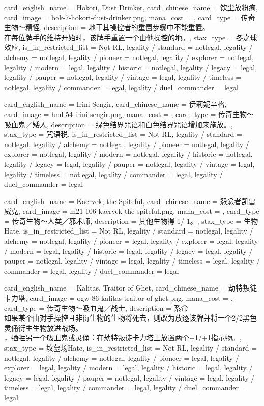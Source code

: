 \documentclass[lang = cn, color = black, 10pt]{AllThatStax}
\begin{document}
\card
{
	card_english_name = {Hokori, Dust Drinker},
	card_chinese_name = {饮尘放粉痢},
	card_image = bok-7-hokori-dust-drinker.png,
	mana_cost = ,
	card_type = 传奇生物～精怪,
	description = {地于其操控者的重置步骤中不能重置。\\
在每位牌手的维持开始时，该牌手重置一个由他操控的地。},
	stax_type = 冬之球效应,
	is_in_restricted_list = Not RL,
	legality / standard = notlegal,
	legality / alchemy = notlegal,
	legality / pioneer = notlegal,
	legality / explorer = notlegal,
	legality / modern = legal,
	legality / historic = notlegal,
	legality / legacy = legal,
	legality / pauper = notlegal,
	legality / vintage = legal,
	legality / timeless = notlegal,
	legality / commander = legal,
	legality / duel_commander = legal
}

\card
{
	card_english_name = {Irini Sengir},
	card_chinese_name = {伊莉妮辛格},
	card_image = hml-54-irini-sengir.png,
	mana_cost = ,
	card_type = 传奇生物～吸血鬼／矮人,
	description = {绿色结界咒语和白色结界咒语增加来施放。},
	stax_type = 咒语税,
	is_in_restricted_list = Not RL,
	legality / standard = notlegal,
	legality / alchemy = notlegal,
	legality / pioneer = notlegal,
	legality / explorer = notlegal,
	legality / modern = notlegal,
	legality / historic = notlegal,
	legality / legacy = legal,
	legality / pauper = notlegal,
	legality / vintage = legal,
	legality / timeless = notlegal,
	legality / commander = legal,
	legality / duel_commander = legal
}

\card
{
	card_english_name = {Kaervek, the Spiteful},
	card_chinese_name = {怨忿者凯雷威克},
	card_image = m21-106-kaervek-the-spiteful.png,
	mana_cost = ,
	card_type = 传奇生物～人类／邪术师,
	description = {其他生物得-1/-1。},
	stax_type = 生物Hate,
	is_in_restricted_list = Not RL,
	legality / standard = notlegal,
	legality / alchemy = notlegal,
	legality / pioneer = legal,
	legality / explorer = legal,
	legality / modern = legal,
	legality / historic = legal,
	legality / legacy = legal,
	legality / pauper = notlegal,
	legality / vintage = legal,
	legality / timeless = legal,
	legality / commander = legal,
	legality / duel_commander = legal
}

\card
{
	card_english_name = {Kalitas, Traitor of Ghet},
	card_chinese_name = {劫特叛徒卡力塔},
	card_image = ogw-86-kalitas-traitor-of-ghet.png,
	mana_cost = ,
	card_type = 传奇生物～吸血鬼／战士,
	description = {系命\\
如果某个由对手操控且非衍生物的生物将死去，则改为放逐该牌并将一个2/2黑色灵俑衍生生物放进战场。\\
，牺牲另一个吸血鬼或灵俑：在劫特叛徒卡力塔上放置两个+1/+1指示物。},
	stax_type = 坟墓场Hate,
	is_in_restricted_list = Not RL,
	legality / standard = notlegal,
	legality / alchemy = notlegal,
	legality / pioneer = legal,
	legality / explorer = legal,
	legality / modern = legal,
	legality / historic = legal,
	legality / legacy = legal,
	legality / pauper = notlegal,
	legality / vintage = legal,
	legality / timeless = legal,
	legality / commander = legal,
	legality / duel_commander = legal
}
\end{document}
